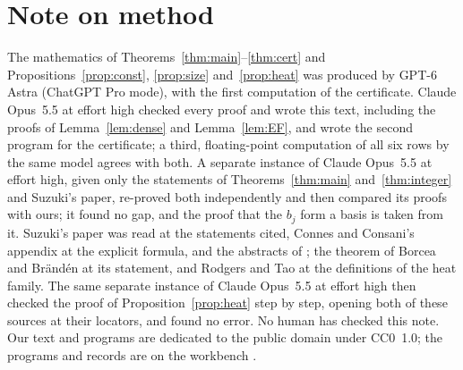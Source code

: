 \documentclass[11pt,a4paper]{article}
\theoremstyle{plain}
\theoremstyle{remark}
\begin{document}
\section*{Note on method}
The mathematics of Theorems~\ref{thm:main}--\ref{thm:cert} and Propositions~\ref{prop:const}, \ref{prop:size}
and~\ref{prop:heat} was
produced by GPT-6 Astra (ChatGPT Pro mode), with the first computation of the certificate. Claude Opus~5.5 at effort
high checked every proof and wrote this text, including the proofs of Lemma~\ref{lem:dense} and
Lemma~\ref{lem:EF}, and wrote the second program for the certificate; a third, floating-point computation of all six
rows by the same model agrees with both. A separate instance of Claude Opus~5.5 at effort high, given only the
statements of Theorems~\ref{thm:main} and~\ref{thm:integer} and Suzuki's paper, re-proved both independently and
then compared its proofs with ours; it found no gap, and the proof that the $b_j$ form a basis is taken from it.
Suzuki's paper was read at the
statements cited, Connes and Consani's appendix at the explicit formula, and the abstracts of
\cite{alpoge-furman,lamzouri,mori,groskin,kim,platt-trudgian}; the theorem of Borcea and Br\"and\'en at its statement, and Rodgers and Tao
at the definitions of the heat family. The same separate instance of Claude Opus~5.5 at effort high then checked
the proof of Proposition~\ref{prop:heat} step by step, opening both of these sources at their locators, and found no
error. No human has checked this note. Our text and programs are dedicated to the public domain under CC0~1.0;
the programs and records are on the workbench \cite{wb}.
\end{document}
